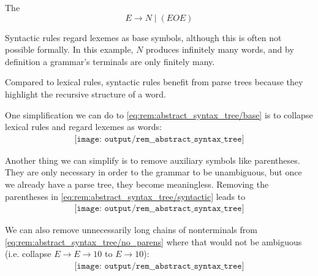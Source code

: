\begin{remark}
\begin{thmenum}
     The 
    \begin{equation*}
      E \to N \mid (E O E)
    \end{equation*}

    Syntactic rules regard lexemes as base symbols, although this is often not possible formally. In this example, \( N \) produces infinitely many words, and by definition a grammar's terminals are only finitely many.

    Compared to lexical rules, syntactic rules benefit from parse trees because they highlight the recursive structure of a word.
  \end{thmenum}

  One simplification we can do to \eqref{eq:rem:abstract_syntax_tree/base} is to collapse lexical rules and regard lexemes as words:
  \begin{equation}\label{eq:rem:abstract_syntax_tree/syntactic}
    \begin{aligned}
      \texttt{[image: output/rem\_\_abstract\_syntax\_tree]}
    \end{aligned}
  \end{equation}

  Another thing we can simplify is to remove auxiliary symbols like parentheses. They are only necessary in order to the grammar to be unambiguous, but once we already have a parse tree, they become meaningless. Removing the parentheses in \eqref{eq:rem:abstract_syntax_tree/syntactic} leads to
  \begin{equation}\label{eq:rem:abstract_syntax_tree/no_parens}
    \begin{aligned}
      \texttt{[image: output/rem\_\_abstract\_syntax\_tree]}
    \end{aligned}
  \end{equation}

  We can also remove unnecessarily long chains of nonterminals from \eqref{eq:rem:abstract_syntax_tree/no_parens} where that would not be ambiguous (i.e. collapse \( E \to E \to 10 \) to \( E \to 10 \)):
  \begin{equation}\label{eq:rem:abstract_syntax_tree/collapsed}
    \begin{aligned}
      \texttt{[image: output/rem\_\_abstract\_syntax\_tree]}
    \end{aligned}
  \end{equation}


\end{remark}
